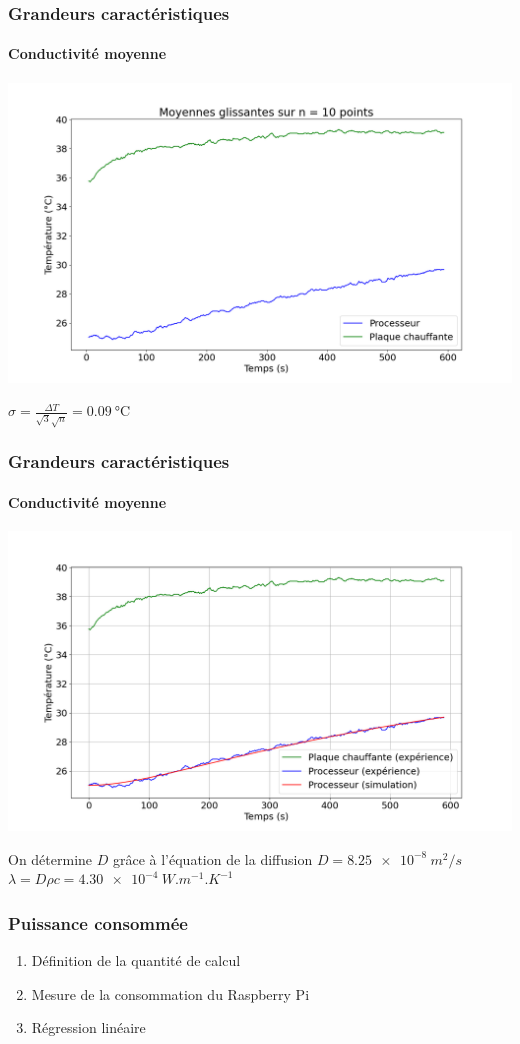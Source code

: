 \documentclass[a4paper,11pt]{beamer}
\newcommand{\cel}{\degreeCelsius}
\begin{document}
\begin{frame}
    \frametitle{Grandeurs caractéristiques}
    \framesubtitle{Conductivité moyenne}
    \includegraphics[width=\textwidth]{moyennes_glissantes.png}
    \begin{center}
        $\sigma = \frac{\Delta T}{\sqrt 3 \sqrt n} = \SI{0,09}{\cel}$
    \end{center}
\end{frame}


\begin{frame}
    \frametitle{Grandeurs caractéristiques}
    \framesubtitle{Conductivité moyenne}
    \includegraphics[width=\textwidth]{d_simulation.png}

    On détermine $D$ grâce à l'équation de la diffusion
    $D = \SI{8.25e-8}{m^2/s}$ \hfill
    $\lambda = D \rho c = \SI{4.30e-4}{W.m^{-1}.K^{-1}}$
\end{frame}

\begin{frame}
    \frametitle{Puissance consommée}

    \begin{enumerate}
        \item Définition de la quantité de calcul
        \item Mesure de la consommation du Raspberry Pi
        \item Régression linéaire
    \end{enumerate}
\end{frame}
\end{document}
